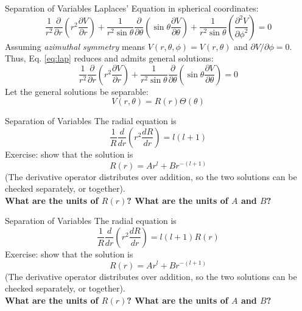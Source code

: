 \documentclass{beamer}
\begin{document}
\begin{frame}{Separation of Variables}
\small
Laplaces' Equation in spherical coordinates:
\begin{equation}
\frac{1}{r^2}\frac{\partial}{\partial r} \left( r^2 \frac{\partial V}{\partial r}\right) + \frac{1}{r^2\sin\theta}\frac{\partial}{\partial \theta} \left( \sin\theta \frac{\partial V}{\partial \theta}\right) + \frac{1}{r^2\sin\theta}\left(\frac{\partial^2 V}{\partial \phi^2}\right) = 0 \label{eq:lap}
\end{equation}
Assuming \textit{azimuthal symmetry} means $V(r,\theta,\phi) = V(r,\theta)$ and $\partial V/ \partial \phi = 0$.  Thus, Eq. \ref{eq:lap} reduces and admits general solutions:
\begin{equation}
\frac{1}{r^2}\frac{\partial}{\partial r} \left( r^2 \frac{\partial V}{\partial r}\right) + \frac{1}{r^2\sin\theta}\frac{\partial}{\partial \theta} \left( \sin\theta \frac{\partial V}{\partial \theta}\right) = 0 \label{eq:lap2}
\end{equation}
Let the general solutions be separable:
\begin{equation}
V(r,\theta) = R(r) \Theta (\theta)
\end{equation}
\end{frame}

\begin{frame}{Separation of Variables}
The radial equation is
\begin{equation}
\frac{1}{R} \frac{d}{dr}\left(r^2 \frac{dR}{dr} \right) = l(l+1)
\end{equation}
Exercise: show that the solution is 
\begin{equation}
R(r) = A r^l + B r^{-(l+1)}
\end{equation}
(The derivative operator distributes over addition, so the two solutions can be checked separately, or together). \\ \vspace{0.5cm}
\textbf{What are the units of $R(r)$?  What are the units of $A$ and $B$?}
\end{frame}

\begin{frame}{Separation of Variables}
The radial equation is
\begin{equation}
\frac{1}{R} \frac{d}{dr}\left(r^2 \frac{dR}{dr} \right) = l(l+1)R(r)
\end{equation}
Exercise: show that the solution is 
\begin{equation}
R(r) = A r^l + B r^{-(l+1)}
\end{equation}
(The derivative operator distributes over addition, so the two solutions can be checked separately, or together). \\ \vspace{0.5cm}
\textbf{What are the units of $R(r)$?  What are the units of $A$ and $B$?}
\end{frame}
\end{document}
